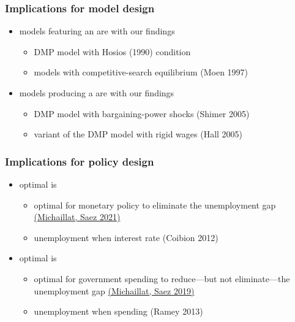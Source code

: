 \documentclass[12pt,xcolor={dvipsnames},hyperref={pdftex,pdfpagemode=UseNone,hidelinks,pdfdisplaydoctitle=true},usepdftitle=false]{beamer}
\begin{document}
\begin{frame}
\frametitle{Implications for model design}
\begin{itemize}
\item models featuring an  are  with our findings
\begin{itemize}
\item DMP model with Hosios (1990) condition
\item models with competitive-search equilibrium (Moen 1997)
\end{itemize}
\item models producing a  are  with our findings
\begin{itemize}
\item DMP model with bargaining-power shocks (Shimer 2005)
\item variant of the DMP model with rigid wages (Hall 2005)
\end{itemize} 
\end{itemize}
\end{frame}

\begin{frame}
\frametitle{Implications for policy design }
\begin{itemize}
\item optimal  is 
\begin{itemize}
\item optimal for monetary policy to eliminate the unemployment gap \href{https://www.pascalmichaillat.org/7.html}{(Michaillat, Saez 2021)}
\item unemployment \up when interest rate \up (Coibion 2012)
\end{itemize}
\item optimal  is 
\begin{itemize}
\item optimal for government spending to reduce---but not eliminate---the unemployment gap \href{https://www.pascalmichaillat.org/6.html}{(Michaillat, Saez 2019)}
\item unemployment \down when spending \up (Ramey 2013)
\end{itemize}
\end{itemize}	
\end{frame}
\end{document}
